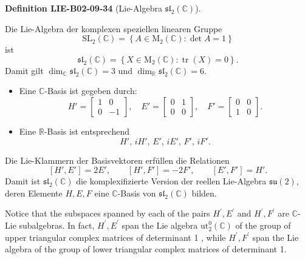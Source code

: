 \documentclass[10pt, letterpaper]{article}
\newcommand{\CustomHeading}[3]{%
  \par\medskip\noindent%
  \textbf{#1 #2} \textnormal{(#3)}.\enskip%
}
\newenvironment{DEF}[2]{\begin{unitbox}\CustomHeading{Definition}{#1}{#2}}{\end{unitbox}}
\begin{document}
\begin{DEF}{LIE-B02-09-34}{Lie-Algebra \(\mathfrak{sl}_2(\mathbb{C})\)}
Die Lie-Algebra der komplexen speziellen linearen Gruppe
\[
\mathrm{SL}_2(\mathbb{C})
=\left\{A\in \mathrm{M}_2(\mathbb{C}) : \det A = 1\right\}
\]
ist
\[
\mathfrak{sl}_2(\mathbb{C})
=\left\{
X\in \mathrm{M}_2(\mathbb{C}) : \operatorname{tr}(X)=0
\right\}.
\]
Damit gilt \(\dim_{\mathbb{C}}\mathfrak{sl}_2(\mathbb{C})=3\) und
\(\dim_{\mathbb{R}}\mathfrak{sl}_2(\mathbb{C})=6\).

\begin{itemize}
\item Eine \(\mathbb{C}\)-Basis ist gegeben durch:
\[
H'=\begin{bmatrix}1 & 0 \\ 0 & -1\end{bmatrix},
\quad
E'=\begin{bmatrix}0 & 1 \\ 0 & 0\end{bmatrix},
\quad
F'=\begin{bmatrix}0 & 0 \\ 1 & 0\end{bmatrix}.
\]
\item Eine \(\mathbb{R}\)-Basis ist entsprechend
\[
H',\, iH',\, E',\, iE',\, F',\, iF'.
\]
\end{itemize}

Die Lie-Klammern der Basisvektoren erfüllen die Relationen
\[
[H',E']=2E',\qquad
[H',F']=-2F',\qquad
[E',F']=H'.
\]
Damit ist \(\mathfrak{sl}_2(\mathbb{C})\) die komplexifizierte Version der
reellen Lie-Algebra \(\mathfrak{su}(2)\), deren Elemente
\(H,E,F\) eine \(\mathbb{C}\)-Basis von \(\mathfrak{sl}_2(\mathbb{C})\) bilden.
\end{DEF}



Notice that the subspaces spanned by each of the pairs $H^{\prime}, E^{\prime}$ and $H^{\prime}, F^{\prime}$ are $\mathbb{C}$-Lie subalgebras. In fact, $H^{\prime}, E^{\prime}$ span the Lie algebra $\mathrm{ut}_{2}^{0}(\mathbb{C})$ of the group of upper triangular complex matrices of determinant 1 , while $H^{\prime}, F^{\prime}$ span the Lie algebra of the group of lower triangular complex matrices of determinant 1.
\end{document}
